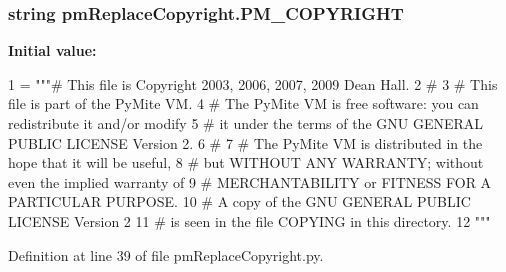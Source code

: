 \hypertarget{namespacepm_replace_copyright_a5690305e1b65a3a05f61ccb58841dbf1}{
\subsubsection[{P\-M\-\_\-\-C\-O\-P\-Y\-R\-I\-G\-H\-T}]{\setlength{\rightskip}{0pt plus 5cm}string pm\-Replace\-Copyright.\-P\-M\-\_\-\-C\-O\-P\-Y\-R\-I\-G\-H\-T}}\label{namespacepm_replace_copyright_a5690305e1b65a3a05f61ccb58841dbf1}
{\bfseries Initial value\-:}
\begin{DoxyCode}
1 = \textcolor{stringliteral}{"""# This file is Copyright 2003, 2006, 2007, 2009 Dean Hall.}
2 \textcolor{stringliteral}{#}
3 \textcolor{stringliteral}{# This file is part of the PyMite VM.}
4 \textcolor{stringliteral}{# The PyMite VM is free software: you can redistribute it and/or modify}
5 \textcolor{stringliteral}{# it under the terms of the GNU GENERAL PUBLIC LICENSE Version 2.}
6 \textcolor{stringliteral}{#}
7 \textcolor{stringliteral}{# The PyMite VM is distributed in the hope that it will be useful,}
8 \textcolor{stringliteral}{# but WITHOUT ANY WARRANTY; without even the implied warranty of}
9 \textcolor{stringliteral}{# MERCHANTABILITY or FITNESS FOR A PARTICULAR PURPOSE.}
10 \textcolor{stringliteral}{# A copy of the GNU GENERAL PUBLIC LICENSE Version 2}
11 \textcolor{stringliteral}{# is seen in the file COPYING in this directory.}
12 \textcolor{stringliteral}{"""}
\end{DoxyCode}


Definition at line 39 of file pm\-Replace\-Copyright.\-py.

